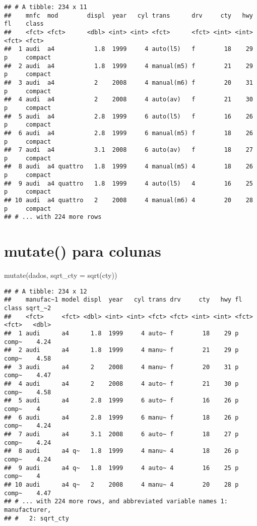 \documentclass[
]{book}
\newenvironment{Shaded}{\begin{snugshade}}{\end{snugshade}}
\newcommand{\AttributeTok}[1]{\textcolor[rgb]{0.77,0.63,0.00}{#1}}
\newcommand{\FunctionTok}[1]{\textcolor[rgb]{0.00,0.00,0.00}{#1}}
\newcommand{\NormalTok}[1]{#1}
\begin{document}
\begin{verbatim}
## # A tibble: 234 x 11
##    mnfc  mod        displ  year   cyl trans      drv     cty   hwy fl    class  
##    <fct> <fct>      <dbl> <int> <int> <fct>      <fct> <int> <int> <fct> <fct>  
##  1 audi  a4           1.8  1999     4 auto(l5)   f        18    29 p     compact
##  2 audi  a4           1.8  1999     4 manual(m5) f        21    29 p     compact
##  3 audi  a4           2    2008     4 manual(m6) f        20    31 p     compact
##  4 audi  a4           2    2008     4 auto(av)   f        21    30 p     compact
##  5 audi  a4           2.8  1999     6 auto(l5)   f        16    26 p     compact
##  6 audi  a4           2.8  1999     6 manual(m5) f        18    26 p     compact
##  7 audi  a4           3.1  2008     6 auto(av)   f        18    27 p     compact
##  8 audi  a4 quattro   1.8  1999     4 manual(m5) 4        18    26 p     compact
##  9 audi  a4 quattro   1.8  1999     4 auto(l5)   4        16    25 p     compact
## 10 audi  a4 quattro   2    2008     4 manual(m6) 4        20    28 p     compact
## # ... with 224 more rows
\end{verbatim}

\hypertarget{mutate-para-colunas}{%
\section{mutate() para colunas}\label{mutate-para-colunas}}

\begin{Shaded}
\begin{Highlighting}[]
\FunctionTok{mutate}\NormalTok{(dados, }\AttributeTok{sqrt\_cty =} \FunctionTok{sqrt}\NormalTok{(cty))}
\end{Highlighting}
\end{Shaded}

\begin{verbatim}
## # A tibble: 234 x 12
##    manufac~1 model displ  year   cyl trans drv     cty   hwy fl    class sqrt_~2
##    <fct>     <fct> <dbl> <int> <int> <fct> <fct> <int> <int> <fct> <fct>   <dbl>
##  1 audi      a4      1.8  1999     4 auto~ f        18    29 p     comp~    4.24
##  2 audi      a4      1.8  1999     4 manu~ f        21    29 p     comp~    4.58
##  3 audi      a4      2    2008     4 manu~ f        20    31 p     comp~    4.47
##  4 audi      a4      2    2008     4 auto~ f        21    30 p     comp~    4.58
##  5 audi      a4      2.8  1999     6 auto~ f        16    26 p     comp~    4   
##  6 audi      a4      2.8  1999     6 manu~ f        18    26 p     comp~    4.24
##  7 audi      a4      3.1  2008     6 auto~ f        18    27 p     comp~    4.24
##  8 audi      a4 q~   1.8  1999     4 manu~ 4        18    26 p     comp~    4.24
##  9 audi      a4 q~   1.8  1999     4 auto~ 4        16    25 p     comp~    4   
## 10 audi      a4 q~   2    2008     4 manu~ 4        20    28 p     comp~    4.47
## # ... with 224 more rows, and abbreviated variable names 1: manufacturer,
## #   2: sqrt_cty
\end{verbatim}
\end{document}
